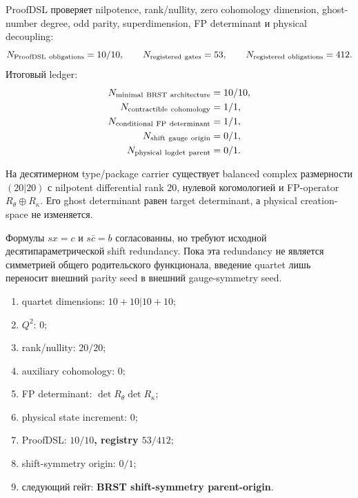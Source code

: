 ProofDSL проверяет nilpotence, rank/nullity, zero cohomology dimension,
ghost-number degree, odd parity, superdimension, FP determinant и
physical decoupling:
\begin{equation}
 N_{\rm ProofDSL\ obligations}=10/10,
 \qquad
 N_{\rm registered\ gates}=53,
 \qquad
 N_{\rm registered\ obligations}=412.
 \label{eq:v9-kms-brst-proofdsl}
\end{equation}
Итоговый ledger:
\begin{equation}
 \begin{aligned}
 N_{\rm minimal\ BRST\ architecture}&=10/10,\\
 N_{\rm contractible\ cohomology}&=1/1,\\
 N_{\rm conditional\ FP\ determinant}&=1/1,\\
 N_{\rm shift\ gauge\ origin}&=0/1,\\
 N_{\rm physical\ logdet\ parent}&=0/1.
 \end{aligned}
 \label{eq:v9-kms-brst-final-ledger}
\end{equation}

\begin{theorem}
На десятимерном type/package carrier существует balanced complex
размерности $(20|20)$ с nilpotent differential rank $20$, нулевой
когомологией и FP-operator $R_\theta\oplus R_\kappa$. Его ghost determinant
равен target determinant, а physical creation-space не изменяется.
\end{theorem}

\begin{nogocriterion}
Формулы $sx=c$ и $s\bar c=b$ согласованны, но требуют исходной
десятипараметрической shift redundancy. Пока эта redundancy не является
симметрией общего родительского функционала, введение quartet лишь переносит внешний parity
seed в внешний gauge-symmetry seed.
\end{nogocriterion}

\begin{protocol}\begin{enumerate}
\item quartet dimensions: \textbf{$10+10|10+10$};
\item $Q^2$: \textbf{$0$};
\item rank/nullity: \textbf{$20/20$};
\item auxiliary cohomology: \textbf{$0$};
\item FP determinant: \textbf{$\det R_\theta\det R_\kappa$};
\item physical state increment: \textbf{$0$};
\item ProofDSL: \textbf{$10/10$, registry $53/412$};
\item shift-symmetry origin: \textbf{$0/1$};
\item следующий гейт: \textbf{BRST shift-symmetry parent-origin}.
\end{enumerate}\end{protocol}

